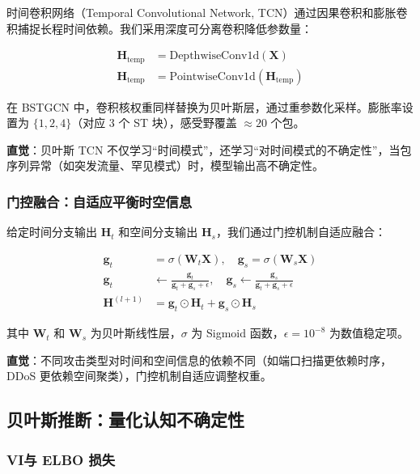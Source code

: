 时间卷积网络（Temporal Convolutional Network, TCN）通过因果卷积和膨胀卷积捕捉长程时间依赖。我们采用深度可分离卷积降低参数量：

\begin{align}
\mathbf{H}_{\text{temp}} &= \text{DepthwiseConv1d}(\mathbf{X}) \\
\mathbf{H}_{\text{temp}} &= \text{PointwiseConv1d}(\mathbf{H}_{\text{temp}})
\end{align}

在 BSTGCN 中，卷积核权重同样替换为贝叶斯层，通过重参数化采样。膨胀率设置为 $\{1, 2, 4\}$（对应 3 个 ST 块），感受野覆盖 $\approx 20$ 个包。

\textbf{直觉}：贝叶斯 TCN 不仅学习``时间模式''，还学习``对时间模式的不确定性''，当包序列异常（如突发流量、罕见模式）时，模型输出高不确定性。

\subsubsection{门控融合：自适应平衡时空信息}

给定时间分支输出 $\mathbf{H}_t$ 和空间分支输出 $\mathbf{H}_s$，我们通过门控机制自适应融合：

\begin{align}
\mathbf{g}_t &= \sigma(\mathbf{W}_t \mathbf{X}), \quad \mathbf{g}_s = \sigma(\mathbf{W}_s \mathbf{X}) \\
\mathbf{g}_t &\leftarrow \frac{\mathbf{g}_t}{\mathbf{g}_t + \mathbf{g}_s + \epsilon}, \quad \mathbf{g}_s \leftarrow \frac{\mathbf{g}_s}{\mathbf{g}_t + \mathbf{g}_s + \epsilon} \\
\mathbf{H}^{(l+1)} &= \mathbf{g}_t \odot \mathbf{H}_t + \mathbf{g}_s \odot \mathbf{H}_s
\end{align}

其中 $\mathbf{W}_t$ 和 $\mathbf{W}_s$ 为贝叶斯线性层，$\sigma$ 为 Sigmoid 函数，$\epsilon=10^{-8}$ 为数值稳定项。

\textbf{直觉}：不同攻击类型对时间和空间信息的依赖不同（如端口扫描更依赖时序，DDoS 更依赖空间聚类），门控机制自适应调整权重。



\subsection{贝叶斯推断：量化认知不确定性}

\subsubsection{VI与 ELBO 损失}

